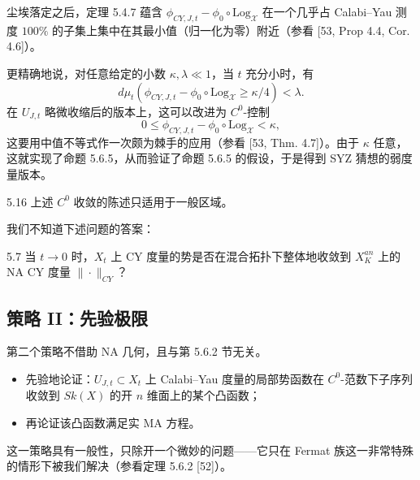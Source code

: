 尘埃落定之后，定理 5.4.7 蕴含 $\phi_{CY,J,t}-\phi_0\circ\mathrm{Log}_{\mathcal X}$ 在一个几乎占 Calabi--Yau 测度 $100\%$ 的子集上集中在其最小值（归一化为零）附近（参看 [53, Prop 4.4, Cor. 4.6]）。


更精确地说，对任意给定的小数 $\kappa,\lambda\ll 1$，当 $t$ 充分小时，有
\begin{equation}
d\mu_t(\phi_{CY,J,t}-\phi_0\circ\mathrm{Log}_{\mathcal X}\ge\kappa/4)<\lambda. \tag{5.21}
\end{equation}
在 $U_{J,t}$ 略微收缩后的版本上，这可以改进为 $C^0$-控制
\[
0\le\phi_{CY,J,t}-\phi_0\circ\mathrm{Log}_{\mathcal X}<\kappa,
\]
这要用中值不等式作一次颇为棘手的应用（参看 [53, Thm. 4.7]）。由于 $\kappa$ 任意，这就实现了命题 5.6.5，从而验证了命题 5.6.5 的假设，于是得到 SYZ 猜想的弱度量版本。


\begin{remark}{5.16}
上述 $C^0$ 收敛的陈述只适用于一般区域。
\end{remark}

我们不知道下述问题的答案：

\begin{question}{5.7}
当 $t\to 0$ 时，$X_t$ 上 CY 度量的势是否在混合拓扑下整体地收敛到 $X_K^{an}$ 上的 NA CY 度量 $\|\cdot\|_{CY}$？
\end{question}


\subsection{策略 II：先验极限}
第二个策略不借助 NA 几何，且与第 5.6.2 节无关。
\begin{itemize}
\item 先验地论证：$U_{J,t}\subset X_t$ 上 Calabi--Yau 度量的局部势函数在 $C^0$-范数下子序列收敛到 $Sk(X)$ 的开 $n$ 维面上的某个凸函数；
\item 再论证该凸函数满足实 MA 方程。
\end{itemize}
这一策略具有一般性，只除开一个微妙的问题------它只在 Fermat 族这一非常特殊的情形下被我们解决（参看定理 5.6.2 [52]）。

